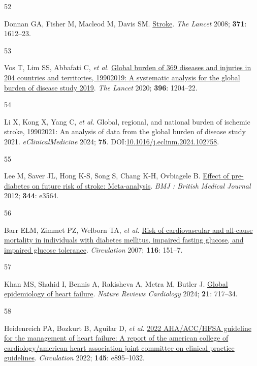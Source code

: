 \documentclass[
  a4paper,
  headsepline=true,
  open=left]{scrbook}
\newlength{\cslhangindent}
\newlength{\csllabelwidth}
\newlength{\cslentryspacingunit} %
\newenvironment{CSLReferences}[2] %
 {%
  \setlength{\parindent}{0pt}
  \ifodd #1
  \let\oldpar\par
  \def\par{\hangindent=\cslhangindent\oldpar}
  \fi
  \setlength{\parskip}{#2\cslentryspacingunit}
 }%
 {}
\newcommand{\CSLLeftMargin}[1]{\parbox[t]{\csllabelwidth}{#1}}
\newcommand{\CSLRightInline}[1]{\parbox[t]{\linewidth - \csllabelwidth}{#1}\break}
\begin{document}
\begin{CSLReferences}{0}{0}
\leavevmode{}%
\CSLLeftMargin{52 }%
\CSLRightInline{Donnan GA, Fisher M, Macleod M, Davis SM.
\href{https://doi.org/10.1016/S0140-6736(08)60694-7}{Stroke}. \emph{The
Lancet} 2008; \textbf{371}: 1612--23.}

\leavevmode{}%
\CSLLeftMargin{53 }%
\CSLRightInline{Vos T, Lim SS, Abbafati C, \emph{et al.}
\href{https://doi.org/10.1016/S0140-6736(20)30925-9}{Global burden of
369 diseases and injuries in 204 countries and territories,
1990{\textendash}2019: A systematic analysis for the global burden of
disease study 2019}. \emph{The Lancet} 2020; \textbf{396}: 1204--22.}

\leavevmode{}%
\CSLLeftMargin{54 }%
\CSLRightInline{Li X, Kong X, Yang C, \emph{et al.} Global, regional,
and national burden of ischemic stroke, 1990{\textendash}2021: An
analysis of data from the global burden of disease study 2021.
\emph{eClinicalMedicine} 2024; \textbf{75}.
DOI:\href{https://doi.org/10.1016/j.eclinm.2024.102758}{10.1016/j.eclinm.2024.102758}.}

\leavevmode{}%
\CSLLeftMargin{55 }%
\CSLRightInline{Lee M, Saver JL, Hong K-S, Song S, Chang K-H, Ovbiagele
B. \href{https://doi.org/10.1136/bmj.e3564}{Effect of pre-diabetes on
future risk of stroke: Meta-analysis}. \emph{BMJ : British Medical
Journal} 2012; \textbf{344}: e3564.}

\leavevmode{}%
\CSLLeftMargin{56 }%
\CSLRightInline{Barr ELM, Zimmet PZ, Welborn TA, \emph{et al.}
\href{https://doi.org/10.1161/CIRCULATIONAHA.106.685628}{Risk of
cardiovascular and all-cause mortality in individuals with diabetes
mellitus, impaired fasting glucose, and impaired glucose tolerance}.
\emph{Circulation} 2007; \textbf{116}: 151--7.}

\leavevmode{}%
\CSLLeftMargin{57 }%
\CSLRightInline{Khan MS, Shahid I, Bennis A, Rakisheva A, Metra M,
Butler J. \href{https://doi.org/10.1038/s41569-024-01046-6}{Global
epidemiology of heart failure}. \emph{Nature Reviews Cardiology} 2024;
\textbf{21}: 717--34.}

\leavevmode{}%
\CSLLeftMargin{58 }%
\CSLRightInline{Heidenreich PA, Bozkurt B, Aguilar D, \emph{et al.}
\href{https://doi.org/10.1161/CIR.0000000000001063}{2022 AHA/ACC/HFSA
guideline for the management of heart failure: A report of the american
college of cardiology/american heart association joint committee on
clinical practice guidelines}. \emph{Circulation} 2022; \textbf{145}:
e895--1032.}


\end{CSLReferences}
\end{document}
